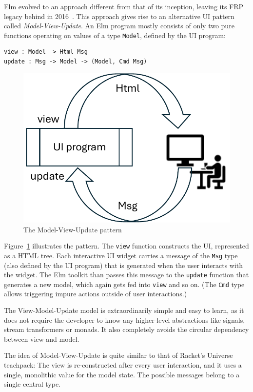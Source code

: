 \documentclass[sigplan,screen]{acmart}
\begin{document}
Elm evolved to an approach different from that of its inception,
leaving its FRP legacy behind in 2016~\cite{ElmFarewellFRP}.  This approach
gives rise to an alternative UI pattern called
\textit{Model-View-Update}.  An Elm program mostly consists of only
two pure functions operating on values of a type \texttt{Model},
defined by the UI program:
%
\begin{verbatim}
view : Model -> Html Msg
update : Msg -> Model -> (Model, Cmd Msg)
\end{verbatim}
%
\begin{figure}
  \centering
  \includegraphics[width=\columnwidth]{model-view-update}
  \caption{The Model-View-Update pattern}
  \label{fig:mvu}
\end{figure}
%
Figure~\ref{fig:mvu} illustrates the pattern.
The \texttt{view} function constructs the UI, represented as a HTML
tree.  Each interactive UI widget carries a message of the
\texttt{Msg} type (also defined by the UI program) that is generated
when the user interacts with the widget.  The Elm toolkit than passes
this message to the \texttt{update} function that generates a new
model, which again gets fed into \texttt{view} and so on.  (The
\texttt{Cmd} type allows triggering impure actions outside of user
interactions.)

The View-Model-Update model is extraordinarily simple and easy to
learn, as it does not require the developer to know any higher-level
abstractions like signals, stream transformers or monads.  It also
completely avoids the circular dependency between view and model.

The idea of Model-View-Update is quite similar to that of Racket's
Universe teachpack: The view is re-constructed after every user
interaction, and it uses a single, monolithic value for the model
state.  The possible messages belong to a single central type.
\end{document}
